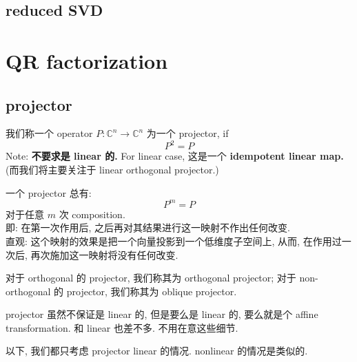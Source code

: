 \documentclass[lang=cn,11pt]{elegantbook}
\begin{document}
\section{reduced SVD}













\chapter{QR factorization}

\section{projector}

\begin{definition}
    我们称一个 operator $P: \mathbb{C}^n \rightarrow \mathbb{C}^n$ 为一个 projector, if \[
    P^2  = P
    \]
Note: \textbf{不要求是 linear 的.} For linear case, 这是一个\textbf{ idempotent linear map.}
(而我们将主要关注于 linear orthogonal projector.)
\end{definition}
\begin{remark}
一个 projector 总有: \[
P^m = P
\]
对于任意 $m$ 次 composition.\\
即: 在第一次作用后, 之后再对其结果进行这一映射不作出任何改变. \\
直观: 这个映射的效果是把一个向量投影到一个低维度子空间上, 从而, 在作用过一次后, 再次施加这一映射将没有任何改变.\\


\end{remark}

\begin{remark}
    对于 orthogonal 的 projector, 我们称其为 orthogonal projector; 对于 non-orthogonal 的 projector, 我们称其为 oblique projector.\\
    
\end{remark}


\begin{remark}
    projector 虽然不保证是 linear 的, 但是要么是 linear 的, 要么就是个 affine transformation. 和 linear 也差不多. 不用在意这些细节. 
\end{remark}

以下, 我们都只考虑 projector linear 的情况. nonlinear 的情况是类似的.
\end{document}
